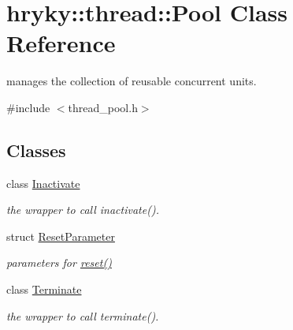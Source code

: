 \hypertarget{classhryky_1_1thread_1_1_pool}{\section{hryky\-:\-:thread\-:\-:Pool Class Reference}
\label{classhryky_1_1thread_1_1_pool}
}


manages the collection of reusable concurrent units.  




{\ttfamily \#include $<$thread\-\_\-pool.\-h$>$}

\subsection*{Classes}
\begin{DoxyCompactItemize}
\item 
class \hyperlink{classhryky_1_1thread_1_1_pool_1_1_inactivate}{Inactivate}
\begin{DoxyCompactList}\small\item\em the wrapper to call inactivate(). \end{DoxyCompactList}\item 
struct \hyperlink{structhryky_1_1thread_1_1_pool_1_1_reset_parameter}{Reset\-Parameter}
\begin{DoxyCompactList}\small\item\em parameters for \hyperlink{classhryky_1_1thread_1_1_pool_a7060b7e3c556334ec71aa2b42401231f}{reset()} \end{DoxyCompactList}\item 
class \hyperlink{classhryky_1_1thread_1_1_pool_1_1_terminate}{Terminate}
\begin{DoxyCompactList}\small\item\em the wrapper to call terminate(). \end{DoxyCompactList}\end{DoxyCompactItemize}
